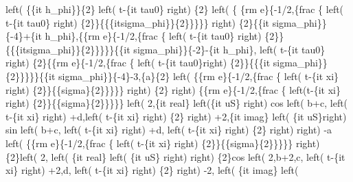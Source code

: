 \begin{maplegroup}
\begin{mapleinput}
\end{mapleinput}
\mapleresult
{}left( \{\{it h\_phi\}\}\{2\} left( t-\{it tau0\} right) \{2\} left( \{
\{rm e\}\{-1/2,\{frac \{ left( t-\{it tau0\} right) \{2\}\}\{\{\{itsigma\_phi\}\}\{2\}\}\}\}\} right) \{2\}\{\{it sigma\_phi\}\}\{-4\}+\{it h\_phi\},\{\{rm e\}\{-1/2,\{frac \{ left( t-\{it tau0\} right) \{2\}\}\{\{\{itsigma\_phi\}\}\{2\}\}\}\}\}\{\{it sigma\_phi\}\}\{-2\}-\{it h\_phi\}, left( t-\{it tau0\} right) \{2\}\{\{rm e\}\{-1/2,\{frac \{ left( t-\{it tau0\}right) \{2\}\}\{\{\{it sigma\_phi\}\}\{2\}\}\}\}\}\{\{it sigma\_phi\}\}\{-4\}-3,\{a\}\{2\} left( \{\{rm e\}\{-1/2,\{frac \{ left( t-\{it xi\} right) \{2\}\}\{\{sigma\}\{2\}\}\}\}\} right) \{2\} right) \{\{rm e\}\{-1/2,\{frac \{ left(t-\{it xi\} right) \{2\}\}\{\{sigma\}\{2\}\}\}\}\} left( 2,\{it real\} left(\{it uS\} right) cos left( b+c, left( t-\{it xi\} right) +d,left( t-\{it xi\} right) \{2\} right) +2,\{it imag\} left( \{it uS\}right) sin left( b+c, left( t-\{it xi\} right) +d, left( t-\{it xi\} right) \{2\} right)  right) -a left( \{\{rm e\}\{-1/2,\{frac \{ left( t-\{it xi\} right) \{2\}\}\{\{sigma\}\{2\}\}\}\}\} right) \{2\}left( 2, left( \{it real\} left( \{it uS\} right)  right) \{2\}cos left( 2,b+2,c, left( t-\{it xi\} right) +2,d, left( t-\{it xi\} right) \{2\} right) -2, left( \{it imag\} left( 
\end{maplegroup}
